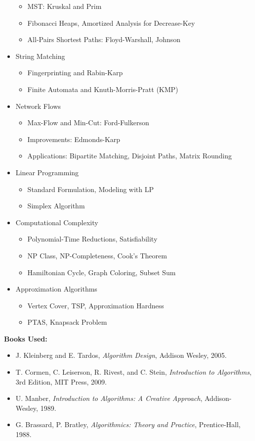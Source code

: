 \documentclass[12pt]{article}
\begin{document}
\begin{itemize}
    \begin{itemize}
        \item MST: Kruskal and Prim
        \item Fibonacci Heaps, Amortized Analysis for Decrease-Key
        \item All-Pairs Shortest Paths: Floyd-Warshall, Johnson
    \end{itemize}
    \item String Matching
    \begin{itemize}
        \item Fingerprinting and Rabin-Karp
        \item Finite Automata and Knuth-Morris-Pratt (KMP)
    \end{itemize}
    \item Network Flows
    \begin{itemize}
        \item Max-Flow and Min-Cut: Ford-Fulkerson
        \item Improvements: Edmonds-Karp
        \item Applications: Bipartite Matching, Disjoint Paths, Matrix Rounding
    \end{itemize}
    \item Linear Programming
    \begin{itemize}
        \item Standard Formulation, Modeling with LP
        \item Simplex Algorithm
    \end{itemize}
    \item Computational Complexity
    \begin{itemize}
        \item Polynomial-Time Reductions, Satisfiability
        \item NP Class, NP-Completeness, Cook’s Theorem
        \item Hamiltonian Cycle, Graph Coloring, Subset Sum
    \end{itemize}
    \item Approximation Algorithms
    \begin{itemize}
        \item Vertex Cover, TSP, Approximation Hardness
        \item PTAS, Knapsack Problem
    \end{itemize}
\end{itemize}

\textbf{Books Used:}
\begin{itemize}
    \item J. Kleinberg and E. Tardos, \textit{Algorithm Design}, Addison Wesley, 2005.
    \item T. Cormen, C. Leiserson, R. Rivest, and C. Stein, \textit{Introduction to Algorithms}, 3rd Edition, MIT Press, 2009.
    \item U. Manber, \textit{Introduction to Algorithms: A Creative Approach}, Addison-Wesley, 1989.
    \item G. Brassard, P. Bratley, \textit{Algorithmics: Theory and Practice}, Prentice-Hall, 1988.
\end{itemize}
\end{document}
